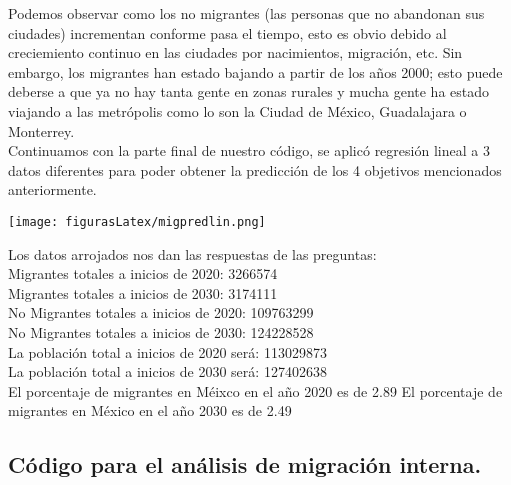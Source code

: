 \documentclass[12pt]{article}
\begin{document}
Podemos observar como los no migrantes (las personas que no abandonan sus ciudades) incrementan conforme pasa el tiempo, esto es obvio debido al creciemiento continuo en las ciudades por nacimientos, migración, etc. Sin embargo, los migrantes han estado bajando a partir de los años 2000; esto puede deberse a que ya no hay tanta gente en zonas rurales y mucha gente ha estado viajando a las metrópolis como lo son la Ciudad de México, Guadalajara o Monterrey.\\

Continuamos con la parte final de nuestro código, se aplicó regresión lineal a 3 datos diferentes para poder obtener la predicción de los 4 objetivos mencionados anteriormente.

\begin{center}
\texttt{[image: figurasLatex/migpredlin.png]} 
\end{center}\label{fig3.3.5}

Los datos arrojados nos dan las respuestas de las preguntas:\\

Migrantes totales a inicios de 2020:  3266574\\
Migrantes totales a inicios de 2030:  3174111\\


No Migrantes totales a inicios de 2020:  109763299\\
No Migrantes totales a inicios de 2030:  124228528\\


La población total a inicios de 2020 será:  113029873\\
La población total a inicios de 2030 será:  127402638\\


El porcentaje de migrantes en Méixco en el año 2020 es de  2.89%
El porcentaje de migrantes en México en el año 2030 es de  2.49%

\subsection{Código para el análisis de migración interna.}
\end{document}
